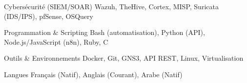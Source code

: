 
\begin{cvskills}

  \cvskill
  {Cybersécurité (SIEM/SOAR)} %
  {Wazuh, TheHive, Cortex, MISP, Suricata (IDS/IPS), pfSense, OSQuery} %

  \cvskill
  {Programmation \& Scripting} %
  {Bash (automatisation), Python (API), Node.js/JavaScript (n8n), Ruby, C} %

  \cvskill
  {Outils \& Environnements} %
  {Docker, Git, GNS3, API REST, Linux, Virtualisation} %

  \cvskill
  {Langues} %
  {Français (Natif), Anglais (Courant), Arabe (Natif)} %

\end{cvskills}
